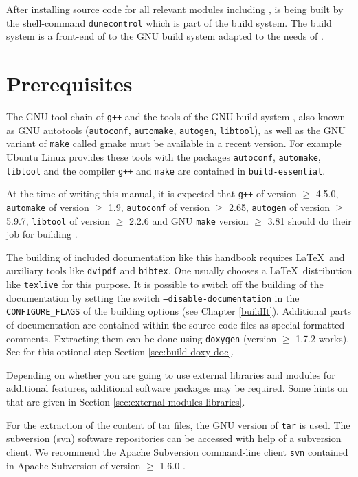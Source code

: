 After installing source code for all relevant \Dune modules including \Dumux, \Dune is being built by the shell-command \texttt{dunecontrol} which is part of the \Dune build system. The \Dune build system is a front-end of to the GNU build system adapted to the needs of \Dune.

\section{Prerequisites} \label{sec:prerequisites}
The GNU tool chain of \texttt{g++}  and the tools of the GNU build system \cite{GNU-BS}, also known as GNU autotools
(\texttt{autoconf}, \texttt{automake}, \texttt{autogen}, \texttt{libtool}), as well as the GNU variant of \texttt{make}
called gmake must be available in a recent version. For example Ubuntu Linux provides these tools with the
packages \texttt{autoconf}, \texttt{automake}, \texttt{libtool}
and the \Cplusplus compiler \texttt{g++} and \texttt{make} are contained in \texttt{build-essential}.

At the time of writing this manual, it is expected that \texttt{g++} of version $\geqslant$ 4.5.0, \texttt{automake} of version $\geqslant$ 1.9,
\texttt{autoconf} of version $\geqslant$ 2.65, \texttt{autogen} of version $\geqslant$ 5.9.7,  \texttt{libtool} of version $\geqslant$ 2.2.6
and GNU \texttt{make} version $\geqslant$ 3.81 should do their job for building \Dumux.

The building of included documentation like this handbook requires \LaTeX\  and auxiliary tools
like \texttt{dvipdf} and \texttt{bibtex}. One usually chooses a \LaTeX\  distribution like \texttt{texlive} for this purpose.
It is possible to switch off the building of the documentation by setting the switch \texttt{--disable-documentation} 
in the \texttt{CONFIGURE\_FLAGS} of the building options (see Chapter \ref{buildIt}).
Additional parts of documentation are contained within the source code files as special formatted comments.
Extracting them can be done using \texttt{doxygen} (version $\geqslant$ 1.7.2 works). 
See for this optional step Section \ref{sec:build-doxy-doc}.

Depending on whether you are going to use external libraries and modules for additional \Dune features, 
additional software packages may be required. Some hints on that are given in Section \ref{sec:external-modules-libraries}.

For the extraction of the content of tar files, the GNU version of \texttt{tar} is used.
The subversion (svn) software repositories can be accessed with help of a subversion client. We recommend the Apache Subversion command-line client \texttt{svn}
contained in Apache Subversion of version $\geqslant$ 1.6.0 \cite{APACHE-SUBVERSION-HP}.

